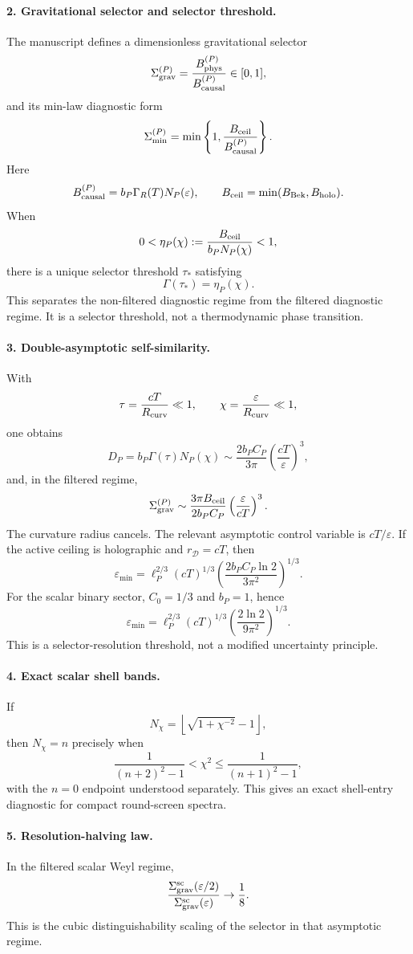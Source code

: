 \documentclass[11pt,a4paper]{article}
\begin{document}
\paragraph{2. Gravitational selector and selector threshold.}
The manuscript defines a dimensionless gravitational selector
\[
\Sigma_{\rm grav}^{(P)}
=
\frac{B_{\rm phys}^{(P)}}{B_{\rm causal}^{(P)}}
\in[0,1],
\]
and its min-law diagnostic form
\[
\Sigma_{\rm min}^{(P)}
=
\min\left\{
1,\frac{B_{\rm ceil}}{B_{\rm causal}^{(P)}}
\right\}.
\]
Here
\[
B_{\rm causal}^{(P)}=b_P\Gamma_R(T)N_P(\varepsilon),
\qquad
B_{\rm ceil}=\min(B_{\rm Bek},B_{\rm holo}).
\]
When
\[
0<\eta_P(\chi):=\frac{B_{\rm ceil}}{b_PN_P(\chi)}<1,
\]
there is a unique selector threshold \(\tau_*\) satisfying
\[
\Gamma(\tau_*)=\eta_P(\chi).
\]
This separates the non-filtered diagnostic regime from the filtered diagnostic regime.  It is a selector threshold, not a thermodynamic phase transition.

\paragraph{3. Double-asymptotic self-similarity.}
With
\[
\tau=\frac{cT}{R_{\rm curv}}\ll1,
\qquad
\chi=\frac{\varepsilon}{R_{\rm curv}}\ll1,
\]
one obtains
\[
D_P
=
b_P\Gamma(\tau)N_P(\chi)
\sim
\frac{2b_PC_P}{3\pi}
\left(\frac{cT}{\varepsilon}\right)^3,
\]
and, in the filtered regime,
\[
\Sigma_{\rm grav}^{(P)}
\sim
\frac{3\pi B_{\rm ceil}}{2b_PC_P}
\left(\frac{\varepsilon}{cT}\right)^3.
\]
The curvature radius cancels.  The relevant asymptotic control variable is \(cT/\varepsilon\).  If the active ceiling is holographic and \(r_{\mathcal D}=cT\), then
\[
\varepsilon_{\min}
=
\ell_P^{2/3}(cT)^{1/3}
\left(
\frac{2b_PC_P\ln2}{3\pi^2}
\right)^{1/3}.
\]
For the scalar binary sector, \(C_0=1/3\) and \(b_P=1\), hence
\[
\varepsilon_{\min}
=
\ell_P^{2/3}(cT)^{1/3}
\left(
\frac{2\ln2}{9\pi^2}
\right)^{1/3}.
\]
This is a selector-resolution threshold, not a modified uncertainty principle.

\paragraph{4. Exact scalar shell bands.}
If
\[
N_\chi=\left\lfloor\sqrt{1+\chi^{-2}}-1\right\rfloor,
\]
then \(N_\chi=n\) precisely when
\[
\frac{1}{(n+2)^2-1}
<
\chi^2
\le
\frac{1}{(n+1)^2-1},
\]
with the \(n=0\) endpoint understood separately.  This gives an exact shell-entry diagnostic for compact round-screen spectra.

\paragraph{5. Resolution-halving law.}
In the filtered scalar Weyl regime,
\[
\frac{\Sigma_{\rm grav}^{\rm sc}(\varepsilon/2)}
{\Sigma_{\rm grav}^{\rm sc}(\varepsilon)}
\to
\frac18.
\]
This is the cubic distinguishability scaling of the selector in that asymptotic regime.
\end{document}
